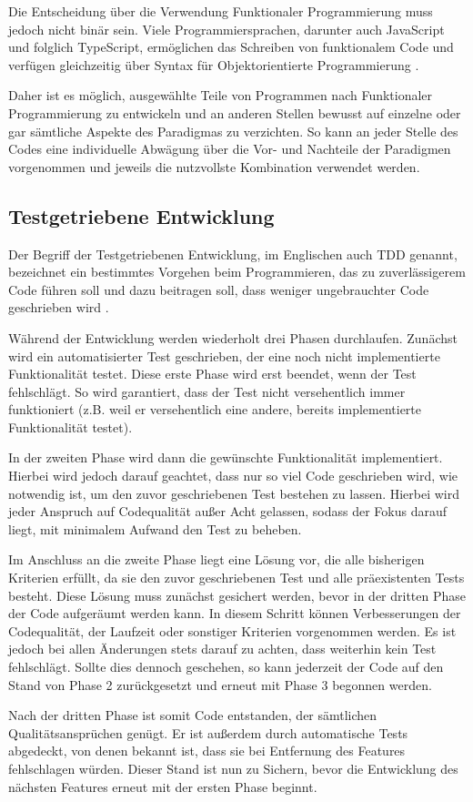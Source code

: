 Die Entscheidung über die Verwendung Funktionaler Programmierung muss jedoch nicht binär sein. Viele Programmiersprachen, darunter auch JavaScript und folglich TypeScript, ermöglichen das Schreiben von funktionalem Code und verfügen gleichzeitig über Syntax für Objektorientierte Programmierung \citep{benton2016js_functional}.

Daher ist es möglich, ausgewählte Teile von Programmen nach Funktionaler Programmierung zu entwickeln und an anderen Stellen bewusst auf einzelne oder gar sämtliche Aspekte des Paradigmas zu verzichten. So kann an jeder Stelle des Codes eine individuelle Abwägung über die Vor- und Nachteile der Paradigmen vorgenommen und jeweils die nutzvollste Kombination verwendet werden.

\subsection{Testgetriebene Entwicklung}
\label{state_of_the_art:tdd}
Der Begriff der Testgetriebenen Entwicklung, im Englischen auch \gls{TDD} genannt, bezeichnet ein bestimmtes Vorgehen beim Programmieren, das zu zuverlässigerem Code führen soll und dazu beitragen soll, dass weniger ungebrauchter Code geschrieben wird \cite{tdd_beck}.

Während der Entwicklung werden wiederholt drei Phasen durchlaufen. Zunächst wird ein automatisierter Test geschrieben, der eine noch nicht implementierte Funktionalität testet. Diese erste Phase wird erst beendet, wenn der Test fehlschlägt. So wird garantiert, dass der Test nicht versehentlich immer funktioniert (z.B. weil er versehentlich eine andere, bereits implementierte Funktionalität testet).

In der zweiten Phase wird dann die gewünschte Funktionalität implementiert. Hierbei wird jedoch darauf geachtet, dass nur so viel Code geschrieben wird, wie notwendig ist, um den zuvor geschriebenen Test bestehen zu lassen. Hierbei wird jeder Anspruch auf Codequalität außer Acht gelassen, sodass der Fokus darauf liegt, mit minimalem Aufwand den Test zu beheben.

Im Anschluss an die zweite Phase liegt eine Lösung vor, die alle bisherigen Kriterien erfüllt, da sie den zuvor geschriebenen Test und alle präexistenten Tests besteht. Diese Lösung muss zunächst gesichert werden, bevor in der dritten Phase der Code aufgeräumt werden kann. In diesem Schritt können Verbesserungen der Codequalität, der Laufzeit oder sonstiger Kriterien vorgenommen werden. Es ist jedoch bei allen Änderungen stets darauf zu achten, dass weiterhin kein Test fehlschlägt. Sollte dies dennoch geschehen, so kann jederzeit der Code auf den Stand von Phase 2 zurückgesetzt und erneut mit Phase 3 begonnen werden.

Nach der dritten Phase ist somit Code entstanden, der sämtlichen Qualitätsansprüchen genügt. Er ist außerdem durch automatische Tests abgedeckt, von denen bekannt ist, dass sie bei Entfernung des Features fehlschlagen würden. Dieser Stand ist nun zu Sichern, bevor die Entwicklung des nächsten Features erneut mit der ersten Phase beginnt.
